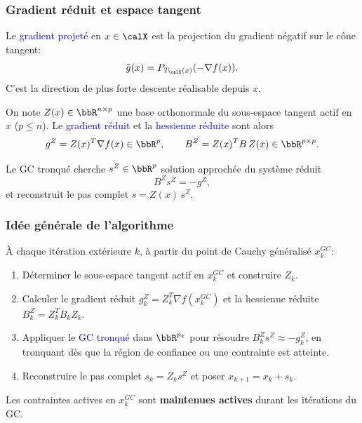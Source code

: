 \documentclass[t,aspectratio=169,usepdftitle=false]{beamer}
\def\cX{\calX}
\begin{document}
\begin{frame}
\frametitle{Gradient réduit et espace tangent}

Le \textcolor{blue}{gradient projeté} en $x \in \cX$ est la projection du gradient négatif sur le cône tangent:
$$
\tilde{g}(x) = P_{T_{\cX}(x)}(-\nabla f(x)).
$$
C'est la direction de plus forte descente réalisable depuis $x$.

\mbox{}

On note $Z(x) \in \bbR^{n \times p}$ une base orthonormale du sous-espace tangent actif en $x$ ($p \leq n$).
Le \textcolor{blue}{gradient réduit} et la \textcolor{blue}{hessienne réduite} sont alors
$$
g^Z = Z(x)^T \nabla f(x) \in \bbR^p, \qquad B^Z = Z(x)^T B\, Z(x) \in \bbR^{p \times p}.
$$

\mbox{}

Le GC tronqué cherche $s^Z \in \bbR^p$ solution approchée du système réduit
$$
B^Z s^Z = -g^Z,
$$
et reconstruit le pas complet $s = Z(x)\, s^Z$.

\end{frame}

\begin{frame}
\frametitle{Idée générale de l'algorithme}

À chaque itération extérieure $k$, à partir du point de Cauchy généralisé $x_k^{GC}$:

\begin{enumerate}
\item Déterminer le sous-espace tangent actif en $x_k^{GC}$ et construire $Z_k$.
\item Calculer le gradient réduit $g_k^Z = Z_k^T \nabla f(x_k^{GC})$ et la hessienne réduite $B_k^Z = Z_k^T B_k Z_k$.
\item Appliquer le \textcolor{blue}{GC tronqué} dans $\bbR^{p_k}$ pour résoudre $B_k^Z s^Z \approx -g_k^Z$, en tronquant dès que la région de confiance ou une contrainte est atteinte.
\item Reconstruire le pas complet $s_k = Z_k s^Z$ et poser $x_{k+1} = x_k + s_k$.
\end{enumerate}

\mbox{}

Les contraintes actives en $x_k^{GC}$ sont \textbf{maintenues actives} durant les itérations du GC.

\end{frame}
\end{document}
